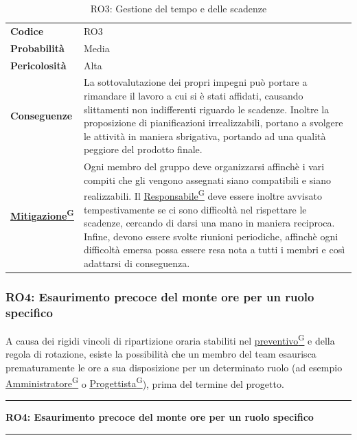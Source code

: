 \documentclass[a4paper,12pt]{article}
\providecommand{\glslink}[2]{\href{https://alittlebyte-19.github.io/Documentazione/glossario.html\#gls-#1}{\underline{#2}\textsuperscript{\scriptsize G}}}
\begin{document}
\begin{table}[h]
\begin{tabular}{>{\bfseries}p{3cm} | p{12.2cm}}
Codice & RO3 \\

Probabilità & Media\\

Pericolosità & Alta\\

Conseguenze & La sottovalutazione dei propri impegni può portare a rimandare il lavoro a cui si è stati affidati, causando slittamenti non indifferenti riguardo le scadenze.
Inoltre la proposizione di pianificazioni irrealizzabili, portano a svolgere le attività in maniera sbrigativa, portando ad una qualità peggiore del prodotto finale. \\

\glslink{mitigazione-dei-rischi}{Mitigazione} & Ogni membro del gruppo deve organizzarsi affinchè i vari compiti che gli vengono assegnati siano compatibili e siano realizzabili. Il \glslink{responsabile}{Responsabile} deve
essere inoltre avvisato tempestivamente se ci sono difficoltà nel rispettare le scadenze, cercando di darsi una mano in maniera reciproca. Infine, devono essere svolte riunioni periodiche, affinchè ogni difficoltà emersa possa essere resa nota a tutti i membri e così adattarsi di conseguenza.\\
\end{tabular}
\caption{RO3: Gestione del tempo e delle scadenze}
\end{table}
\newpage

\subsubsection{RO4: Esaurimento precoce del monte ore per un ruolo specifico}
A causa dei rigidi vincoli di ripartizione oraria stabiliti nel \glslink{preventivo}{preventivo} e della regola di rotazione, esiste la possibilità che un membro del team esaurisca prematuramente le ore a sua disposizione per un determinato ruolo (ad esempio \glslink{amministratore}{Amministratore} o \glslink{progettista}{Progettista}), prima del termine del progetto.

\vspace{0.5cm}
\hrule
\vspace{0.5em}
\textbf{RO4: Esaurimento precoce del monte ore per un ruolo specifico}
\vspace{0.5em}
\hrule
\vspace{1cm}
\end{document}
